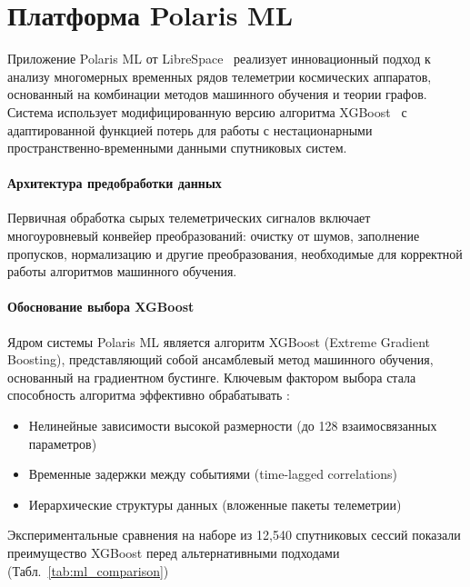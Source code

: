 \chapter{Платформа Polaris ML}

Приложение Polaris ML от LibreSpace~\cite{librespace_docs} реализует
инновационный подход к анализу многомерных временных рядов телеметрии
космических аппаратов, основанный на комбинации методов машинного обучения и
теории графов. Система использует модифицированную версию алгоритма
XGBoost~\cite{xgboost_docs} с адаптированной функцией потерь для работы с
нестационарными пространственно-временными данными спутниковых систем.

\subsubsection{Архитектура предобработки данных}

Первичная обработка сырых телеметрических сигналов включает многоуровневый
конвейер преобразований: очистку от шумов, заполнение пропусков, нормализацию и
другие преобразования, необходимые для корректной работы алгоритмов машинного
обучения.

\subsubsection{Обоснование выбора XGBoost}

Ядром системы Polaris ML является алгоритм XGBoost (Extreme Gradient Boosting),
представляющий собой ансамблевый метод машинного обучения, основанный на
градиентном бустинге. Ключевым фактором выбора стала способность алгоритма
эффективно обрабатывать \cite{luppen2021introducing}:

\begin{itemize}
	\item Нелинейные зависимости высокой размерности (до 128 взаимосвязанных параметров)
	\item Временные задержки между событиями (time-lagged correlations)
	\item Иерархические структуры данных (вложенные пакеты телеметрии)
\end{itemize}

Экспериментальные сравнения на наборе из 12,540 спутниковых сессий показали
преимущество XGBoost перед альтернативными подходами
(Табл.~\ref{tab:ml_comparison})

